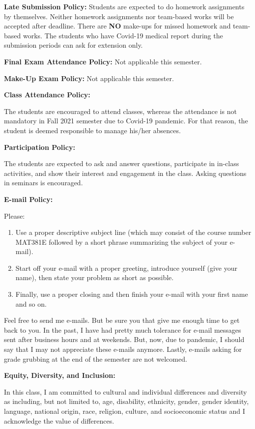 \documentclass[
  12pt,
]{article}
\providecommand{\tightlist}{%
  \setlength{\itemsep}{0pt}\setlength{\parskip}{0pt}}
\begin{document}
\textbf{Late Submission Policy:} Students are expected to do homework
assignments by themselves. Neither homework assignments nor team-based
works will be accepted after deadline. There are \textbf{NO} make-ups
for missed homework and team-based works. The students who have Covid-19
medical report during the submission periods can ask for extension only.

\textbf{Final Exam Attendance Policy:} Not applicable this semester.

\textbf{Make-Up Exam Policy:} Not applicable this semester.

\textbf{Class Attendance Policy:}

The students are encouraged to attend classes, whereas the attendance is
not mandatory in Fall 2021 semester due to Covid-19 pandemic. For that
reason, the student is deemed responsible to manage his/her absences.

\textbf{Participation Policy:}

The students are expected to ask and answer questions, participate in
in-class activities, and show their interest and engagement in the
class. Asking questions in seminars is encouraged.

\textbf{E-mail Policy:}

Please:

\begin{enumerate}
\def\labelenumi{\arabic{enumi}.}
\tightlist
\item
  Use a proper descriptive subject line (which may consist of the course
  number MAT381E followed by a short phrase summarizing the subject of
  your e-mail).
\item
  Start off your e-mail with a proper greeting, introduce yourself (give
  your name), then state your problem as short as possible.
\item
  Finally, use a proper closing and then finish your e-mail with your
  first name and so on.
\end{enumerate}

Feel free to send me e-mails. But be sure you that give me enough time
to get back to you. In the past, I have had pretty much tolerance for
e-mail messages sent after business hours and at weekends. But, now, due
to pandemic, I should say that I may not appreciate these e-mails
anymore. Lastly, e-mails asking for grade grubbing at the end of the
semester are not welcomed.

\textbf{Equity, Diversity, and Inclusion:}

In this class, I am committed to cultural and individual differences and
diversity as including, but not limited to, age, disability, ethnicity,
gender, gender identity, language, national origin, race, religion,
culture, and socioeconomic status and I acknowledge the value of
differences.
\end{document}
